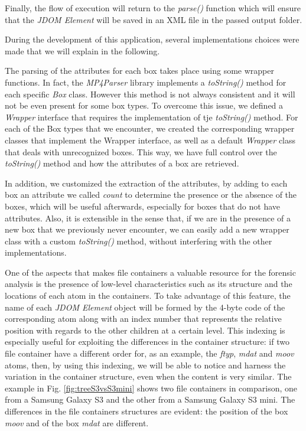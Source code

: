 Finally, the flow of execution will return to the \emph{parse()} function which will ensure that the \emph{JDOM Element} will be saved in an XML file in the passed output folder.

During the development of this application, several implementations choices were made that we will explain in the following.

The parsing of the attributes for each box takes place using some wrapper functions. In fact, the \emph{MP4Parser} library implements a \emph{toString()} method for each specific \emph{Box} class. However this method is not always consistent and it will not be even present for some box types. To overcome this issue, we defined a \emph{Wrapper} interface that requires the implementation of tje \emph{toString()} method. For each of the Box types that we encounter, we created the corresponding wrapper classes that implement the Wrapper interface, as well as a default \emph{Wrapper} class that deals with unrecognized boxes. This way, we have full control over the \emph{toString()} method and how the attributes of a box are retrieved. 

In addition, we customized the extraction of the attributes, by adding to each box an attribute we called \emph{count} to determine the presence or the absence of the boxes, which will be useful afterwards, especially for boxes that do not have attributes.
Also, it is extensible in the sense that, if we are in the presence of a new box that we previously never encounter, we can easily add a new wrapper class with a custom \emph{toString()} method, without interfering with the other implementations.

One of the aspects that makes file containers a valuable resource for the forensic analysis is the presence of low-level characteristics such as its structure and the locations of each atom in the containers. To take advantage of this feature, the name of each \emph{JDOM Element} object will be formed by the 4-byte code of the corresponding atom along with an index number that represents the relative position with regards to the other children at a certain level. This indexing is especially useful for exploiting the differences in the container structure: if two file container have a different order for, as an example, the \emph{ftyp}, \emph{mdat} and \emph{moov} atoms, then, by using this indexing, we will be able to notice and harness the variation in the container structure, even when the content is very similar. The example in Fig. \ref{fig:treeS3vsS3mini} shows two file containers in comparison, one from a Samsung Galaxy S3 and the other from a Samsung Galaxy S3 mini. The differences in the file containers structures are evident: the position of the box \emph{moov} and of the box \emph{mdat} are different. 

